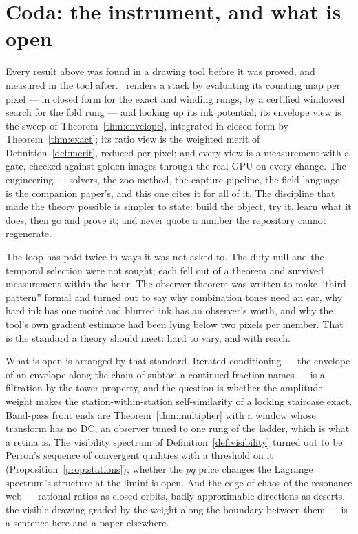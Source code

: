 \section{Coda: the instrument, and what is open}
\label{sec:coda}

Every result above was found in a drawing tool before it was proved, and
measured in the tool after. \Moire\ renders a stack by evaluating its counting
map per pixel --- in closed form for the exact and winding rungs, by a
certified windowed search for the fold rung --- and looking up its ink
potential; its envelope view is the sweep of Theorem~\ref{thm:envelope},
integrated in closed form by Theorem~\ref{thm:exact}; its ratio view is the
weighted merit of Definition~\ref{def:merit}, reduced per pixel; and every
view is a measurement with a gate, checked against golden images through the
real GPU on every change. The engineering --- solvers, the zoo method, the
capture pipeline, the field language --- is the companion paper's, and this
one cites it for all of it. The discipline that made the theory possible is
simpler to state: build the object, try it, learn what it does, then go and
prove it; and never quote a number the repository cannot regenerate.

The loop has paid twice in ways it was not asked to. The duty null and the
temporal selection were not sought; each fell out of a theorem and survived
measurement within the hour. The observer theorem was written to make
``third pattern'' formal and turned out to say why combination tones need an
ear, why hard ink has one moir\'e and blurred ink has an observer's worth, and
why the tool's own gradient estimate had been lying below two pixels per
member. That is the standard a theory should meet: hard to vary, and with
reach.

What is open is arranged by that standard. Iterated conditioning --- the
envelope of an envelope along the chain of subtori a continued fraction
names --- is a filtration by the tower property, and the question is whether
the amplitude weight makes the station-within-station self-similarity of a
locking staircase exact. Band-pass front ends are Theorem~\ref{thm:multiplier}
with a window whose transform has no DC, an observer tuned to one rung of the
ladder, which is what a retina is. The visibility spectrum of
Definition~\ref{def:visibility} turned out to be Perron's sequence of
convergent qualities with a threshold on it (Proposition~\ref{prop:stations});
whether the $pq$ price changes the Lagrange spectrum's structure at the
liminf is open. And the edge of chaos of the resonance web --- rational ratios as
closed orbits, badly approximable directions as deserts, the visible drawing
graded by the weight along the boundary between them --- is a sentence here
and a paper elsewhere.
